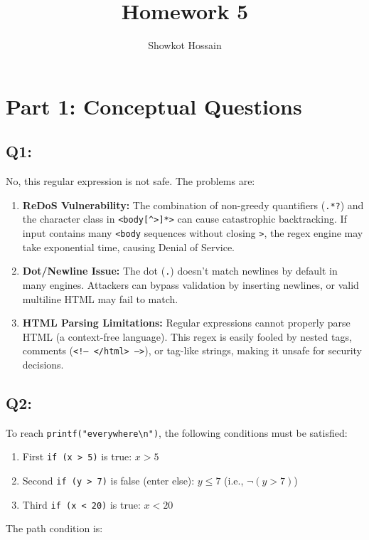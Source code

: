 \documentclass[12pt]{article}
\title{\vspace{-1.5cm}Homework 5}
\author{Showkot Hossain}
\date{}
\begin{document}
\maketitle
\vspace{-0.5cm}

\section*{Part 1: Conceptual Questions}
\vspace{-0.2cm}

\subsection*{Q1: }
\vspace{-0.1cm}
No, this regular expression is not safe. The problems are:

\begin{enumerate}
    \setlength\itemsep{-0.1em}
    \item \textbf{ReDoS Vulnerability:} The combination of non-greedy quantifiers (\texttt{.*?}) and the character class in \texttt{<body[\^{}>]*>} can cause catastrophic backtracking. If input contains many \texttt{<body} sequences without closing \texttt{>}, the regex engine may take exponential time, causing Denial of Service.
    
    \item \textbf{Dot/Newline Issue:} The dot (\texttt{.}) doesn't match newlines by default in many engines. Attackers can bypass validation by inserting newlines, or valid multiline HTML may fail to match.
    
    \item \textbf{HTML Parsing Limitations:} Regular expressions cannot properly parse HTML (a context-free language). This regex is easily fooled by nested tags, comments (\texttt{<!-- </html> -->}), or tag-like strings, making it unsafe for security decisions.
\end{enumerate}

\subsection*{Q2: }
To reach \texttt{printf("everywhere\textbackslash n")}, the following conditions must be satisfied:

\begin{enumerate}
    \setlength\itemsep{-0.1em}
    \item First \texttt{if (x > 5)} is true: $x > 5$
    \item Second \texttt{if (y > 7)} is false (enter else): $y \le 7$ (i.e., $\neg(y > 7)$)
    \item Third \texttt{if (x < 20)} is true: $x < 20$
\end{enumerate}

\vspace{0.1cm}
\noindent The path condition is: 
\end{document}
